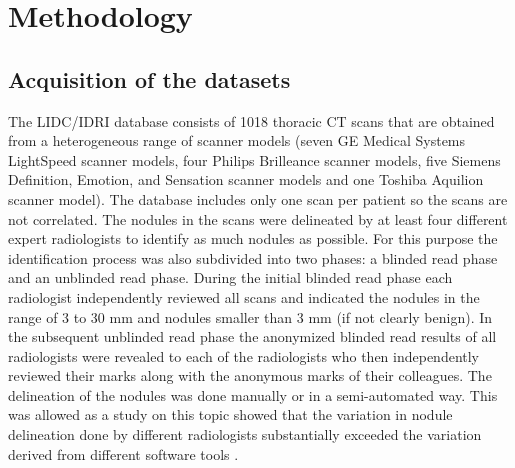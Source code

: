 \section{Methodology}
\subsection{Acquisition of the datasets}
The LIDC/IDRI database consists of 1018 thoracic CT scans that are obtained from
a heterogeneous range of scanner models (seven GE Medical Systems LightSpeed
scanner models, four Philips Brilleance scanner models, five Siemens Definition,
Emotion, and Sensation scanner models and one Toshiba Aquilion scanner model).
The database includes only one scan per patient so the scans are not correlated.
The nodules in the scans were delineated by at least four different expert
radiologists to identify as much nodules as possible. For this purpose the
identification process was also subdivided into two phases: a blinded read
phase and an unblinded read phase. During the initial blinded read phase each
radiologist independently reviewed all scans and indicated the nodules in the
range of 3 to 30 mm and nodules smaller than 3 mm (if not clearly benign).
In the subsequent unblinded read phase the anonymized blinded read results of
all radiologists were revealed to each of the radiologists who then
independently reviewed their marks along with the anonymous marks of their
colleagues. The delineation of the nodules was done manually or in a
semi-automated way. This was allowed as a study on this topic showed that the
variation in nodule delineation done by different radiologists substantially
exceeded the variation derived from different software tools \cite{lidcbase}.

